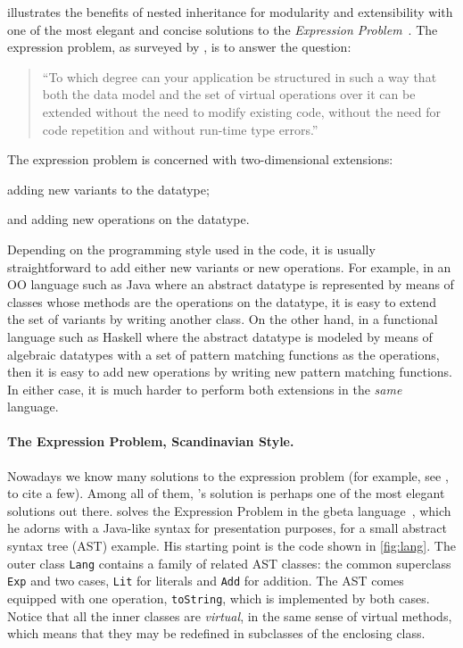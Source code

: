 \citet{ernst2004expression} illustrates the benefits of nested inheritance for modularity
and extensibility with one of the most elegant and concise solutions to the
\emph{Expression Problem}~\citep{wadler1998expression}. The expression problem,
as surveyed by \citet{togersen:2004}, is to answer the question:
\begin{quote}
  ``To which degree can your application be structured in such a way that both
  the data model and the set of virtual operations over it can be extended
  without the need to modify existing code, without the need for code repetition
  and without run-time type errors.''
\end{quote}
The expression problem is concerned with two-dimensional extensions:
\begin{inparaenum}[(1)]
\item adding new variants to the datatype;
\item and adding new operations on the datatype.
\end{inparaenum}
Depending on the programming style used in the code, it is usually
straightforward to add either new variants or new operations. For example, in an
OO language such as Java where an abstract datatype is represented by means of
classes whose methods are the operations on the datatype, it is easy to extend
the set of variants by writing another class. On the other hand, in a functional
language such as Haskell where the abstract datatype is modeled by means of
algebraic datatypes with a set of pattern matching functions as the operations,
then it is easy to add new operations by writing new pattern matching functions.
In either case, it is much harder to perform both extensions in the
\textit{same} language.


\paragraph{The Expression Problem, Scandinavian Style.}

Nowadays we know many solutions to the expression problem (for example, see
\citet{oliveira2012extensibility, wang2016expression, oliveira09modular,
  swierstra_2008, Zenger-Odersky2005}, to cite a few). Among all of them,
\citeauthor{ernst2004expression}'s solution is perhaps one of the most elegant
solutions out there. \citeauthor{ernst2004expression} solves the Expression
Problem in the \textsf{gbeta} language~\citep{ernst2000gbeta}, which he adorns with a Java-like syntax for
presentation purposes, for a small abstract syntax tree (AST) example. His
starting point is the code shown in \cref{fig:lang}. The outer class
\lstinline{Lang} contains a family of related AST classes: the common superclass
\lstinline{Exp} and two cases, \lstinline{Lit} for literals and \lstinline{Add}
for addition. The AST comes equipped with one operation, \lstinline{toString},
which is implemented by both cases. Notice that all the inner classes are
\textit{virtual}, in the same sense of virtual methods, which means that they
may be redefined in subclasses of the enclosing class.


